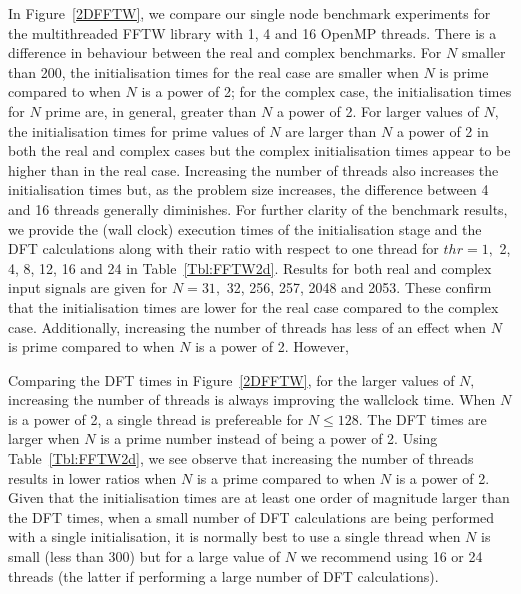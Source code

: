 \documentclass[a4paper]{article}
\begin{document}
In Figure~\ref{2DFFTW}, we compare our single node benchmark
experiments for the multithreaded FFTW library with 1, 4 and 16 OpenMP
threads. There is a difference in behaviour between the real and
complex benchmarks. For $N$ smaller than 200, the initialisation times
for the real case are smaller when $N$ is prime compared to when $N$
is a power of 2; for the complex case, the initialisation times for
$N$ prime are, in general, greater than $N$ a power of 2. For larger
values of $N,$ the initialisation times for prime values of $N$ are
larger than $N$ a power of 2 in both the real and complex cases but
the complex initialisation times appear to be higher than in the real
case. Increasing the number of threads also increases the
initialisation times but, as the problem size increases, the
difference between 4 and 16 threads generally diminishes. For further
clarity of the benchmark results, we provide the (wall clock)
execution times of the initialisation stage and the DFT calculations
along with their ratio with respect to one thread for $thr=1,$ 2, 4,
8, 12, 16 and 24 in Table~\ref{Tbl:FFTW2d}. Results for both real and
complex input signals are given for $N=31,$ 32, 256, 257, 2048 and
2053. These confirm that the initialisation times are lower for the
real case compared to the complex case. Additionally, increasing the
number of threads has less of an effect when $N$ is prime compared to
when $N$ is a power of 2. However,

Comparing the DFT times in Figure~\ref{2DFFTW}, for the larger values
of $N,$ increasing the number of threads is always improving the
wallclock time. When $N$ is a power of 2, a single thread is
prefereable for $N\le 128.$ The DFT times are larger when $N$ is a
prime number instead of being a power of 2. Using
Table~\ref{Tbl:FFTW2d}, we see observe that increasing the number of
threads results in lower ratios when $N$ is a prime compared to when
$N$ is a power of 2. Given that the initialisation times are at least
one order of magnitude larger than the DFT times, when a small number
of DFT calculations are being performed with a single initialisation,
it is normally best to use a single thread when $N$ is small (less
than 300) but for a large value of $N$ we recommend using 16 or 24
threads (the latter if performing a large number of DFT calculations).
\end{document}
